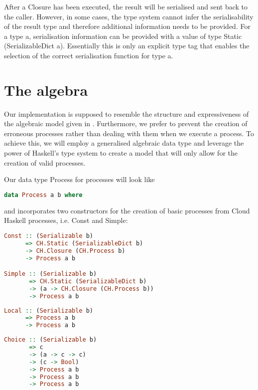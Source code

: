 After a \textsf{Closure} has been executed, the result will be serialised and sent back to the caller. However, in some cases, the type system cannot infer the serialisability of the result type and therefore additional information needs to be provided. For a type \textsf{a}, serialisation information can be provided with a value of type \textsf{Static (SerializableDict a)}. Essentially this is only an explicit type tag that enables the selection of the correct serialisation function for type \textsf{a}.

\section{The algebra}
Our implementation is supposed to resemble the structure and expressiveness of the algebraic model given in . Furthermore, we prefer to prevent the creation of erroneous processes rather than dealing with them when we execute a process. To achieve this, we will employ a generalised algebraic data type and leverage the power of Haskell's type system to create a model that will only allow for the creation of valid processes.

Our data type \textsf{Process} for processes will look like
\begin{lstlisting}[language=Haskell]
data Process a b where 
\end{lstlisting}
and incorporates two constructors for the creation of basic processes from Cloud Haskell processes, i.e. \textsf{Const} and \textsf{Simple}:
\begin{lstlisting}[language=Haskell]
Const :: (Serializable b) 
      => CH.Static (SerializableDict b)
      -> CH.Closure (CH.Process b)
      -> Process a b

Simple :: (Serializable b) 
       => CH.Static (SerializableDict b)
       -> (a -> CH.Closure (CH.Process b))
       -> Process a b
\end{lstlisting}

\begin{lstlisting}[language=Haskell]
Local :: (Serializable b) 
      => Process a b
      -> Process a b
\end{lstlisting}

\begin{lstlisting}[language=Haskell]
Choice :: (Serializable b)
       => c
       -> (a -> c -> c)
       -> (c -> Bool)
       -> Process a b
       -> Process a b
       -> Process a b
\end{lstlisting}

